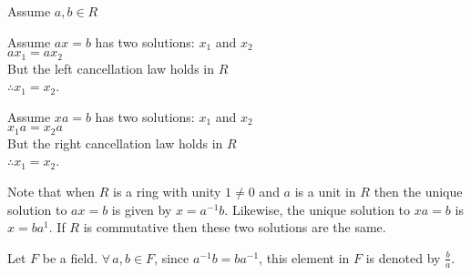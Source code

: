 \documentclass[letterpaper,12pt,fleqn]{article}
\begin{document}
\begin{theproof}
  Assume $a,b\in R$

  Assume $ax=b$ has two solutions: $x_1$ and $x_2$ \\
  $ax_1=ax_2$ \\
  But the left cancellation law holds in $R$ \\
  $\therefore x_1=x_2$.

  Assume $xa=b$ has two solutions: $x_1$ and $x_2$ \\
  $x_1a=x_2a$ \\
  But the right cancellation law holds in $R$ \\
  $\therefore x_1=x_2$.
\end{theproof}

Note that when $R$ is a ring with unity $1\ne0$ and $a$ is a unit in $R$ then
the unique solution to $ax=b$ is given by $x=a^{-1}b$. Likewise, the unique
solution to $xa=b$ is $x=ba^{1}$. If $R$ is commutative then these two
solutions are the same.

\begin{notation}
  Let $F$ be a field. $\forall\,a,b\in F$, since $a^{-1}b=ba^{-1}$, this
  element in $F$ is denoted by $\frac{b}{a}$.
\end{notation}
\end{document}
